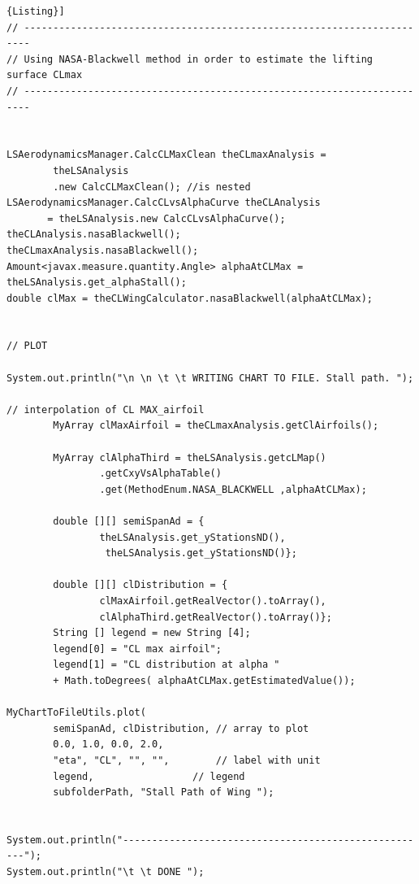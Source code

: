 \begin{lstlisting}[frame=rbl,caption={{\footnotesize Lift Characteristics of a Lifting Surface - Test Class}},label= [style=\bfseries]{Listing}]
// -----------------------------------------------------------------------
// Using NASA-Blackwell method in order to estimate the lifting surface CLmax
// -----------------------------------------------------------------------


LSAerodynamicsManager.CalcCLMaxClean theCLmaxAnalysis = 
		theLSAnalysis
		.new CalcCLMaxClean(); //is nested
LSAerodynamicsManager.CalcCLvsAlphaCurve theCLAnalysis
       = theLSAnalysis.new CalcCLvsAlphaCurve();
theCLAnalysis.nasaBlackwell();
theCLmaxAnalysis.nasaBlackwell();
Amount<javax.measure.quantity.Angle> alphaAtCLMax = theLSAnalysis.get_alphaStall();
double clMax = theCLWingCalculator.nasaBlackwell(alphaAtCLMax);


// PLOT

System.out.println("\n \n \t \t WRITING CHART TO FILE. Stall path. ");

// interpolation of CL MAX_airfoil
		MyArray clMaxAirfoil = theCLmaxAnalysis.getClAirfoils();

		MyArray clAlphaThird = theLSAnalysis.getcLMap()
				.getCxyVsAlphaTable()
				.get(MethodEnum.NASA_BLACKWELL ,alphaAtCLMax);

		double [][] semiSpanAd = {
				theLSAnalysis.get_yStationsND(),
				 theLSAnalysis.get_yStationsND()};

		double [][] clDistribution = {
				clMaxAirfoil.getRealVector().toArray(), 
				clAlphaThird.getRealVector().toArray()};
		String [] legend = new String [4];
		legend[0] = "CL max airfoil";
		legend[1] = "CL distribution at alpha " 
		+ Math.toDegrees( alphaAtCLMax.getEstimatedValue());

MyChartToFileUtils.plot(
		semiSpanAd,	clDistribution, // array to plot
		0.0, 1.0, 0.0, 2.0,					
		"eta", "CL", "", "",	    // label with unit
		legend,					// legend
		subfolderPath, "Stall Path of Wing ");			


System.out.println("-----------------------------------------------------");
System.out.println("\t \t DONE ");

\end{lstlisting}


